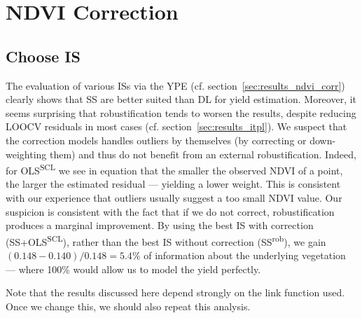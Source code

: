 \section{NDVI Correction}{\label{sec:discussion_corr}
    \subsection{Choose {{IS}}}\label{sec:discussion_iplfstrategy-choose}

    The evaluation of various ISs via the YPE (cf. section~\ref{sec:results_ndvi_corr}) clearly shows that SS are better suited than DL for yield estimation. Moreover, it seems surprising that robustification tends to worsen the results, despite reducing LOOCV residuals in most cases (cf. section~\ref{sec:results_itpl}). We suspect that the correction models handles outliers by themselves (by correcting or down-weighting them) and thus do not benefit from an external robustification. Indeed, for OLS\textsuperscript{SCL} we see in equation  that the smaller the observed NDVI of a point, the larger the estimated residual --- yielding a lower weight. This is consistent with our experience that outliers usually suggest a too small NDVI value. Our suspicion is consistent with the fact that if we do not correct, robustification produces a marginal improvement. 
    By using the best IS with correction (SS+OLS\textsuperscript{SCL}), rather than the best IS without correction (SS\textsuperscript{rob}), we gain $(0.148-0.140)/0.148 = 5.4\%$ of information about the underlying vegetation --- where 100\% would allow us to model the yield perfectly.
    
    Note that the results discussed here depend strongly on the link function used. Once we change this, we should also repeat this analysis.
            


}
